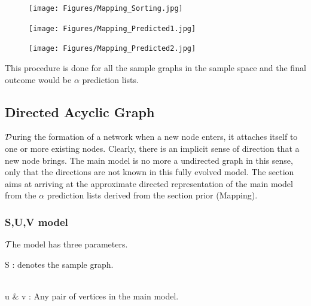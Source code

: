 \documentclass{article}
\begin{document}
\begin{figure}[htp]
\centering
\texttt{[image: Figures/Mapping\_Sorting.jpg]}
\caption{}
\label{}
\end{figure}

\begin{figure}[htp]
\centering
\texttt{[image: Figures/Mapping\_Predicted1.jpg]}
\caption{}
\label{}
\end{figure}

\begin{figure}[htp]
\centering
\texttt{[image: Figures/Mapping\_Predicted2.jpg]}
\caption{}
\label{}
\end{figure}

This procedure is done for all the sample graphs in the sample space and the final outcome would be $\alpha$ prediction lists.

\subsection{Directed Acyclic Graph}

\hspace{.18in}$\cal D$uring the formation of a network when a new node enters, it attaches itself to one or more existing nodes. Clearly, there is an implicit sense of direction that a new node brings. The main model is no more a undirected graph in this sense, only that the directions are not known in this fully evolved model.
The section aims at arriving at the approximate directed representation of the main model from the $\alpha$ prediction lists derived from the section prior (Mapping).

\subsubsection{S,U,V model }
$\cal T$he model has three parameters.

S : denotes the sample graph.
\\\

u \& v : Any pair of vertices in the main model.
\\\
\end{document}
